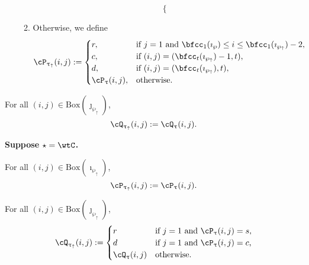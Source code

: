 \documentclass[12pt,a4paper]{amsart}
\def\ttau{\tilde{\tau}}
\def\wpu{\wp_{\uparrow}}
\def\wpd{\wp} %
\def\uptauu{\uptau_{\uparrow}}
\def\uptaud{\uptau} %
\def\PPm{\wp_{\downarrow}}
\def\uptaum{\uptau_{\downarrow}}
\numberwithin{equation}{section}
\theoremstyle{remark}
\newcommand{\BOX}[1]{\mathrm{Box}(#1)}
\def\PBP{\mathsf{PBP}}
\def\PBPs{\mathsf{PBP}_{\star}}
\begin{document}
\begin{enumerate}[label=(\alph*)]
\begin{enumerate}[label={\localtextbulletone}]
\[\begin{cases}
       \end{cases}
     \]
     \item Otherwise, we define
     \[
       \cP_{\uptauu}(i,j) := \begin{cases}
         r ,& \text{if $j=1$ and $\bfcc_{1}(\imath_{\wpd})\leq i \leq \bfcc_{1}(\imath_{\wpu})-2$},\\
         c ,& \text{if $(i,j)=(\bfcc_{t}(\imath_{\wpu})-1,t)$},\\
         d ,& \text{if $(i,j)=(\bfcc_{t}(\imath_{\wpu}),t)$},\\
         \cP_{\uptaud}(i,j) ,&\text{otherwise}.
       \end{cases}
     \]
   \end{enumerate}
 \end{enumerate}

  For all $(i,j)\in \BOX{\jmath_{\wpu}}$,
   \[
     \cQ_{\uptauu}(i,j) := \cQ_{\uptau}(i,j).
   \]

{\bfseries Suppose $\star = \wtC$.}

  For all $(i,j)\in \BOX{\imath_{\wpu}}$,
   \[
     \cP_{\uptauu}(i,j) := \cP_{\uptau}(i,j).
   \]

  For all $(i,j)\in \BOX{\jmath_{\wpu}}$,
   \[
     \cQ_{\uptauu}(i,j) :=
     \begin{cases}
       r& \text{if $j=1$ and  $\cP_{\uptau}(i,j)=s$,}\\
       d& \text{if $j=1$ and  $\cP_{\uptau}(i,j)=c$,}\\
       \cQ_{\uptau}(i,j) &\text{otherwise.}
     \end{cases}
   \]


\end{document}
